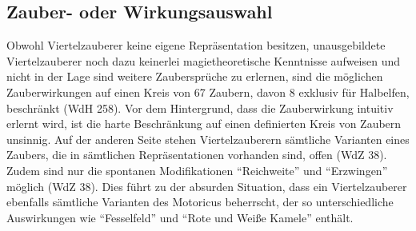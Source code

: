 \subsection{Zauber- oder Wirkungsauswahl}
Obwohl Viertelzauberer keine eigene Repräsentation besitzen, unausgebildete Viertelzauberer noch dazu keinerlei magietheoretische Kenntnisse aufweisen und nicht in der Lage sind weitere Zaubersprüche zu erlernen, sind die möglichen Zauberwirkungen auf einen Kreis von 67 Zaubern, davon 8 exklusiv für Halbelfen, beschränkt (WdH 258). Vor dem Hintergrund, dass die Zauberwirkung intuitiv erlernt wird, ist die harte Beschränkung auf einen definierten Kreis von Zaubern unsinnig. Auf der anderen Seite stehen Viertelzauberern sämtliche Varianten eines Zaubers, die in sämtlichen Repräsentationen vorhanden sind, offen (WdZ 38). Zudem sind nur die spontanen Modifikationen \enquote{Reichweite} und \enquote{Erzwingen} möglich (WdZ 38). Dies führt zu der absurden Situation, dass ein Viertelzauberer ebenfalls sämtliche Varianten des Motoricus beherrscht, der so unterschiedliche Auswirkungen wie \enquote{Fesselfeld} und \enquote{Rote und Weiße Kamele} enthält.
